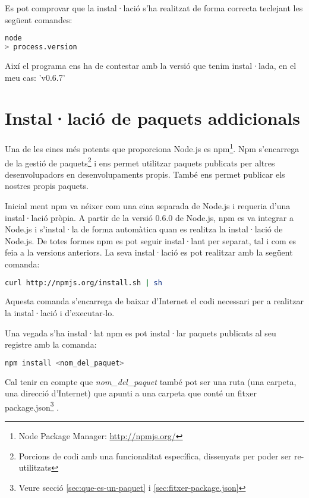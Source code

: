 Es pot comprovar que la instal·lació s'ha realitzat de forma correcta teclejant les següent comandes: 

\begin{lstlisting}[language=bash]
node
> process.version
\end{lstlisting}

Així el programa ens ha de contestar amb la versió que tenim instal·lada, en el meu cas: 'v0.6.7'

\section{Instal·lació de paquets addicionals}
\label{sec:paquets-adicionals}
Una de les eines més potents que proporciona Node.js es npm\footnote{Node Package Manager: \url{http://npmjs.org/}}.
Npm s'encarrega de la gestió de paquets\footnote{Porcions de codi amb una funcionalitat específica, dissenyats per poder ser re-utilitzats} i ens permet utilitzar paquets publicats per altres desenvolupadors en desenvolupaments propis. També ens permet publicar els nostres propis paquets. 

Inicial ment npm va néixer com una eina separada de Node.js i requeria d'una instal·lació pròpia. A partir de la versió 0.6.0 de Node.js, npm es va integrar a Node.js i s'instal·la de forma automàtica quan es realitza la instal·lació de Node.js. De totes formes npm es pot seguir instal·lant per separat, tal i com es feia a la versions anteriors. La seva instal·lació es pot realitzar amb la següent comanda:

\begin{lstlisting}[language=bash]
curl http://npmjs.org/install.sh | sh
\end{lstlisting}

Aquesta comanda s'encarrega de baixar d'Internet el codi necessari per a realitzar la instal·lació i d'executar-lo. 

Una vegada s'ha instal·lat npm es pot instal·lar paquets publicats al seu registre amb la comanda:

\begin{lstlisting}[language=bash]
npm install <nom_del_paquet>
\end{lstlisting}

Cal tenir en compte que \emph{nom\_del\_paquet} també pot ser una ruta (una carpeta, una direcció d'Internet) que apunti a una carpeta que conté un fitxer package.json\footnote{Veure secció \ref{sec:que-es-un-paquet} i \ref{sec:fitxer-package.json}} . 


